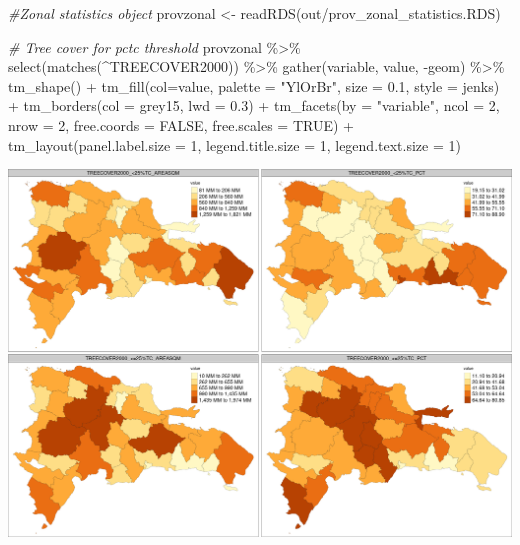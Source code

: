 \documentclass[10pt,landscape,a3paper]{article}
\newenvironment{Shaded}{\begin{snugshade}}{\end{snugshade}}
\newcommand{\AttributeTok}[1]{\textcolor[rgb]{0.77,0.63,0.00}{#1}}
\newcommand{\CommentTok}[1]{\textcolor[rgb]{0.56,0.35,0.01}{\textit{#1}}}
\newcommand{\ConstantTok}[1]{\textcolor[rgb]{0.00,0.00,0.00}{#1}}
\newcommand{\DecValTok}[1]{\textcolor[rgb]{0.00,0.00,0.81}{#1}}
\newcommand{\FloatTok}[1]{\textcolor[rgb]{0.00,0.00,0.81}{#1}}
\newcommand{\FunctionTok}[1]{\textcolor[rgb]{0.00,0.00,0.00}{#1}}
\newcommand{\NormalTok}[1]{#1}
\newcommand{\OtherTok}[1]{\textcolor[rgb]{0.56,0.35,0.01}{#1}}
\newcommand{\SpecialCharTok}[1]{\textcolor[rgb]{0.00,0.00,0.00}{#1}}
\newcommand{\StringTok}[1]{\textcolor[rgb]{0.31,0.60,0.02}{#1}}
\begin{document}
\begin{Shaded}
\begin{Highlighting}[]
\CommentTok{\#Zonal statistics object}
\NormalTok{provzonal }\OtherTok{\textless{}{-}} \FunctionTok{readRDS}\NormalTok{(}\StringTok{\textquotesingle{}out/prov\_zonal\_statistics.RDS\textquotesingle{}}\NormalTok{)}

\CommentTok{\# Tree cover for pctc threshold}
\NormalTok{provzonal }\SpecialCharTok{\%\textgreater{}\%} \FunctionTok{select}\NormalTok{(}\FunctionTok{matches}\NormalTok{(}\StringTok{\textquotesingle{}\^{}TREECOVER2000\textquotesingle{}}\NormalTok{)) }\SpecialCharTok{\%\textgreater{}\%}
  \FunctionTok{gather}\NormalTok{(variable, value, }\SpecialCharTok{{-}}\NormalTok{geom) }\SpecialCharTok{\%\textgreater{}\%}
  \FunctionTok{tm\_shape}\NormalTok{() }\SpecialCharTok{+}
    \FunctionTok{tm\_fill}\NormalTok{(}\AttributeTok{col=}\StringTok{\textquotesingle{}value\textquotesingle{}}\NormalTok{, }\AttributeTok{palette =} \StringTok{"YlOrBr"}\NormalTok{, }\AttributeTok{size =} \FloatTok{0.1}\NormalTok{, }\AttributeTok{style =} \StringTok{\textquotesingle{}jenks\textquotesingle{}}\NormalTok{) }\SpecialCharTok{+}
    \FunctionTok{tm\_borders}\NormalTok{(}\AttributeTok{col =} \StringTok{\textquotesingle{}grey15\textquotesingle{}}\NormalTok{, }\AttributeTok{lwd =} \FloatTok{0.3}\NormalTok{) }\SpecialCharTok{+}
    \FunctionTok{tm\_facets}\NormalTok{(}\AttributeTok{by =} \StringTok{"variable"}\NormalTok{, }\AttributeTok{ncol =} \DecValTok{2}\NormalTok{, }\AttributeTok{nrow =} \DecValTok{2}\NormalTok{, }\AttributeTok{free.coords =} \ConstantTok{FALSE}\NormalTok{, }\AttributeTok{free.scales =} \ConstantTok{TRUE}\NormalTok{) }\SpecialCharTok{+}
    \FunctionTok{tm\_layout}\NormalTok{(}\AttributeTok{panel.label.size =} \DecValTok{1}\NormalTok{, }\AttributeTok{legend.title.size =} \DecValTok{1}\NormalTok{, }\AttributeTok{legend.text.size =} \DecValTok{1}\NormalTok{)}
\end{Highlighting}
\end{Shaded}

\begin{center}\includegraphics{img/zonal-prov-1} \end{center}
\end{document}
